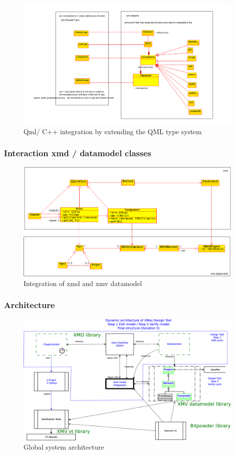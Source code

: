 \begin{figure}
    \includegraphics[width=\textwidth]{qml-cpp-extension}
    \caption{Qml/ C++ integration by extending the QML type system}
    \label{fig:qml-cpp-classes}
\end{figure}


\subsubsection{Interaction xmd / datamodel classes}

\begin{figure}
    \includegraphics[width=\textwidth]{xmd-xmv-integration}
    \caption{Integration of xmd and xmv datamodel}
\end{figure}


\newpage
\subsubsection{Architecture}

\begin{figure}[ht]
    \includegraphics[width=\textwidth]{1c-architecture-dynamic-2}
    \caption{Global system architecture}
\end{figure}
